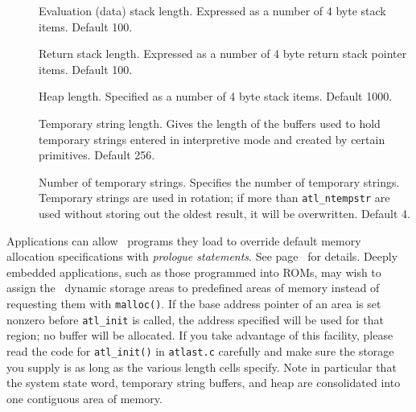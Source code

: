 \documentclass[twocolumn]{article}
\begin{document}
\begin{description}
\item[]          Evaluation (data) stack length.  Expressed
                            as a number of 4 byte stack items.
                            Default 100. \\
\item[]         Return stack length.  Expressed as a
                            number of 4 byte return stack pointer
                            items.  Default 100. \\
\item[]         Heap length.  Specified as a number of
                            4 byte stack items.  Default 1000. \\
\item[]        Temporary string length.  Gives the
                            length of the buffers used to hold
                            temporary strings entered in interpretive
                            mode and created by certain primitives.
                            Default 256. \\
\item[]        Number of temporary strings.  Specifies
                            the number of temporary strings.
                            Temporary strings are used in rotation; if
                            more than \verb+atl_ntempstr+ are used
                            without storing out the oldest result,
                            it will be overwritten.
                            Default 4.
\end{description}

Applications can allow \atlast\ programs they load to override default
memory allocation specifications with {\em prologue statements}.  See
page~\pageref{`prologue'} for details.  Deeply embedded applications,
such as those programmed into ROMs, may wish to assign the \atlast\
dynamic storage areas to predefined areas of memory instead of
requesting them with {\tt malloc()}.  If the base address pointer of
an area is set nonzero before \verb+atl_init+ is called, the address
specified will be used for that region; no buffer will be allocated.
If you take advantage of this facility, please read the code for
\verb+atl_init()+ in {\tt atlast.c} carefully and make sure the storage
you supply is as long as the various length cells specify.  Note in
particular that the system state word, temporary string buffers, and
heap are consolidated into one contiguous area of memory.
\end{document}
